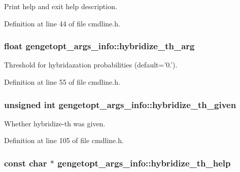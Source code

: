 Print help and exit help description. 



Definition at line 44 of file cmdline.\+h.

\hypertarget{structgengetopt__args__info_ae8618e9bfeb0de8e9b095ecec22af5c5}{
\subsubsection[{hybridize\+\_\+th\+\_\+arg}]{\setlength{\rightskip}{0pt plus 5cm}float gengetopt\+\_\+args\+\_\+info\+::hybridize\+\_\+th\+\_\+arg}}\label{structgengetopt__args__info_ae8618e9bfeb0de8e9b095ecec22af5c5}


Threshold for hybridazation probabilities (default='0.'). 



Definition at line 55 of file cmdline.\+h.

\hypertarget{structgengetopt__args__info_a8cfc0b8596b61b015d998df7255326a2}{
\subsubsection[{hybridize\+\_\+th\+\_\+given}]{\setlength{\rightskip}{0pt plus 5cm}unsigned int gengetopt\+\_\+args\+\_\+info\+::hybridize\+\_\+th\+\_\+given}}\label{structgengetopt__args__info_a8cfc0b8596b61b015d998df7255326a2}


Whether hybridize-\/th was given. 



Definition at line 105 of file cmdline.\+h.

\hypertarget{structgengetopt__args__info_a80b3003903fe0c9bfe6cacffcff587ae}{
\subsubsection[{hybridize\+\_\+th\+\_\+help}]{\setlength{\rightskip}{0pt plus 5cm}const char $\ast$ gengetopt\+\_\+args\+\_\+info\+::hybridize\+\_\+th\+\_\+help}}\label{structgengetopt__args__info_a80b3003903fe0c9bfe6cacffcff587ae}



